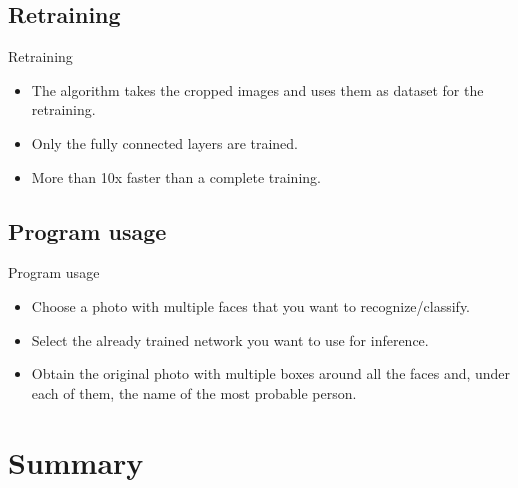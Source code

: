 \documentclass{beamer}
\begin{document}
\subsection{Retraining}

\begin{frame}{Retraining}
\begin{itemize}
		\setlength\itemsep{1em}
		[triangle]
		
			\item 
				The algorithm takes the cropped images and uses them as dataset for the retraining.
			\item 
				Only the fully connected layers are trained.
			\item
				More than 10x faster than a complete training.
		
	\end{itemize}
\end{frame}

\subsection{Program usage}
\begin{frame}{Program usage}
\begin{itemize}
		\setlength\itemsep{1em}
		[triangle]
		
			\item 
				Choose a photo with multiple faces that you want to recognize/classify.
			\item 
				Select the already trained network you want to use for inference.
			\item
				Obtain the original photo with multiple boxes around all the faces and, under each of them, the name of the most probable person.
		
	\end{itemize}
\end{frame}




\section{Summary}
\end{document}
